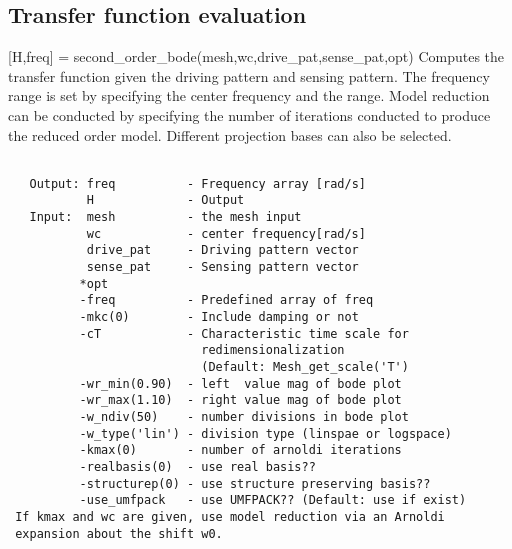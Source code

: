 \subsection{Transfer function evaluation}
\begin{codelist}

  \item[{[H,freq]} = second\_order\_bode(mesh,wc,drive\_pat,sense\_pat,opt)]
  Computes the transfer function given the driving pattern and sensing pattern.
  The frequency range is set by specifying the center frequency  and
  the range. Model reduction can be conducted by specifying the number of iterations
   conducted to produce the reduced order model. Different projection 
  bases can also be selected.
\begin{verbatim}

   Output: freq          - Frequency array [rad/s]
           H             - Output
   Input:  mesh          - the mesh input
           wc            - center frequency[rad/s]
           drive_pat     - Driving pattern vector
           sense_pat     - Sensing pattern vector
          *opt
          -freq          - Predefined array of freq
          -mkc(0)        - Include damping or not
          -cT            - Characteristic time scale for
                           redimensionalization
                           (Default: Mesh_get_scale('T')
          -wr_min(0.90)  - left  value mag of bode plot
          -wr_max(1.10)  - right value mag of bode plot
          -w_ndiv(50)    - number divisions in bode plot
          -w_type('lin') - division type (linspae or logspace)
          -kmax(0)       - number of arnoldi iterations
          -realbasis(0)  - use real basis??
          -structurep(0) - use structure preserving basis??
          -use_umfpack   - use UMFPACK?? (Default: use if exist)
 If kmax and wc are given, use model reduction via an Arnoldi
 expansion about the shift w0.  
\end{verbatim}

\end{codelist}

